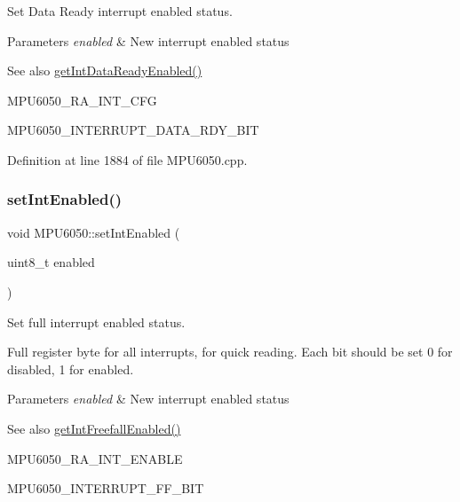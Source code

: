 Set Data Ready interrupt enabled status. 


\begin{DoxyParams}{Parameters}
{\em enabled} & New interrupt enabled status \\
\hline
\end{DoxyParams}
\begin{DoxySeeAlso}{See also}
\mbox{\hyperlink{classMPU6050_ae15f6043a74c9c9bf9754824802ce8d3}{get\+Int\+Data\+Ready\+Enabled()}} 

M\+P\+U6050\+\_\+\+R\+A\+\_\+\+I\+N\+T\+\_\+\+C\+FG 

M\+P\+U6050\+\_\+\+I\+N\+T\+E\+R\+R\+U\+P\+T\+\_\+\+D\+A\+T\+A\+\_\+\+R\+D\+Y\+\_\+\+B\+IT 
\end{DoxySeeAlso}


Definition at line 1884 of file M\+P\+U6050.\+cpp.

\mbox{\label{classMPU6050_ac7bcf24249dd5000320a8ec0ffe488c6}} 
\subsubsection{\texorpdfstring{setIntEnabled()}{setIntEnabled()}}
{\footnotesize\ttfamily void M\+P\+U6050\+::set\+Int\+Enabled (\begin{DoxyParamCaption}\item[{uint8\+\_\+t}]{enabled }\end{DoxyParamCaption})}



Set full interrupt enabled status. 

Full register byte for all interrupts, for quick reading. Each bit should be set 0 for disabled, 1 for enabled. 
\begin{DoxyParams}{Parameters}
{\em enabled} & New interrupt enabled status \\
\hline
\end{DoxyParams}
\begin{DoxySeeAlso}{See also}
\mbox{\hyperlink{classMPU6050_a500bb2df2e46eaecd3fb2ba7304a5ed3}{get\+Int\+Freefall\+Enabled()}} 

M\+P\+U6050\+\_\+\+R\+A\+\_\+\+I\+N\+T\+\_\+\+E\+N\+A\+B\+LE 

M\+P\+U6050\+\_\+\+I\+N\+T\+E\+R\+R\+U\+P\+T\+\_\+\+F\+F\+\_\+\+B\+IT 
\end{DoxySeeAlso}


